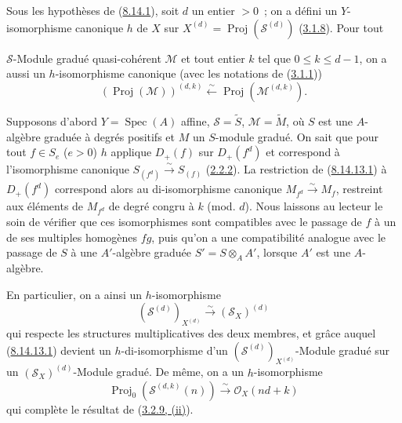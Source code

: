 \begin{remark}[8.14.13]
\label{II.8.14.13-fr}
Sous les hypothèses de (\hyperref[II.8.14.1-fr]{8.14.1}), soit $d$ un entier
$>0$~; on a défini un $Y$-isomorphisme canonique $h$ de $X$ sur
$X^{(d)}=\operatorname{Proj}(\mathcal{S}^{(d)})$
(\hyperref[II.3.1.8-fr]{3.1.8}). Pour tout

$\mathcal{S}$-Module gradué quasi-cohérent $\mathcal{M}$ et tout entier $k$
tel que $0\leqslant k\leqslant d-1$, on a aussi un $h$-isomorphisme canonique
(avec les notations de (\hyperref[II.3.1.1-fr]{3.1.1}))
\begin{equation}
\label{II.8.14.13.1-fr}
  (\operatorname{Proj}(\mathcal{M}))^{(d,k)}
  \xleftarrow{\sim}\operatorname{Proj}(\mathcal{M}^{(d,k)}).
\tag{8.14.13.1}
\end{equation}

Supposons d'abord $Y=\operatorname{Spec}(A)$ affine,
$\mathcal{S}=\widetilde{S}$, $\mathcal{M}=\widetilde{M}$, où $S$ est une
$A$-algèbre graduée à degrés positifs et $M$ un $S$-module gradué. On sait
que pour tout $f\in S_e$ ($e>0$) $h$ applique $D_+(f)$ sur $D_+(f^d)$ et
correspond à l'isomorphisme canonique
$S_{(f^d)}\xrightarrow{\sim}S_{(f)}$
(\hyperref[II.2.2.2-fr]{2.2.2}). La restriction de
(\hyperref[II.8.14.13.1-fr]{8.14.13.1}) à $D_+(f^d)$ correspond alors au
di-isomorphisme canonique $M_{f^d}\xrightarrow{\sim}M_f$, restreint aux
éléments de $M_{f^d}$ de degré congru à $k$ (mod. $d$). Nous laissons au
lecteur le soin de vérifier que ces isomorphismes sont compatibles avec le
passage de $f$ à un de ses multiples homogènes $fg$, puis qu'on a une
compatibilité analogue avec le passage de $S$ à une $A'$-algèbre graduée
$S'=S\otimes_A A'$, lorsque $A'$ est une $A$-algèbre.

En particulier, on a ainsi un $h$-isomorphisme
\begin{equation}
\label{II.8.14.13.2-fr}
  (\mathcal{S}^{(d)})_{X^{(d)}}
  \xrightarrow{\sim}(\mathcal{S}_X)^{(d)}
\tag{8.14.13.2}
\end{equation}
qui respecte les structures multiplicatives des deux membres, et grâce auquel
(\hyperref[II.8.14.13.1-fr]{8.14.13.1}) devient un $h$-di-isomorphisme d'un
$(\mathcal{S}^{(d)})_{X^{(d)}}$-Module gradué sur un
$(\mathcal{S}_X)^{(d)}$-Module gradué. De même, on a un $h$-isomorphisme
\begin{equation}
\label{II.8.14.13.3-fr}
  \operatorname{Proj}_0(\mathcal{S}^{(d,k)}(n))
  \xrightarrow{\sim}\mathcal{O}_X(nd+k)
\tag{8.14.13.3}
\end{equation}
qui complète le résultat de (\hyperref[II.3.2.9-fr]{3.2.9, (ii)}).


\end{remark}
